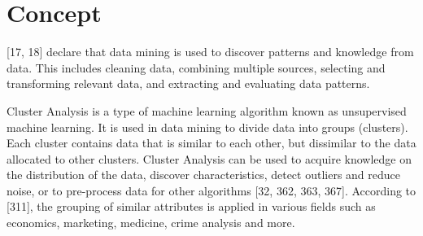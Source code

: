 \documentclass[12pt,a4paper]{article}
\title{\titlename}
\author{ \authorid\\ \scriptsize \address }
\date{\exposedate}
\begin{document}

\maketitle

\section*{Concept}

\textcite{han2011data}[17, 18] declare that data mining is used to discover patterns and knowledge from data. This includes cleaning data, combining multiple sources, selecting and transforming relevant data, and extracting and evaluating data patterns.

Cluster Analysis is a type of machine learning algorithm known as unsupervised machine learning. It is used in data mining to divide data into groups (clusters). Each cluster contains data that is similar to each other, but dissimilar to the data allocated to other clusters. Cluster Analysis can be used to acquire knowledge on the distribution of the data, discover characteristics, detect outliers and reduce noise, or to pre-process data for other algorithms \autocite{han2011data}[32, 362, 363, 367]. According to \textcite{bramer2007principles}[311], the grouping of similar attributes is applied in various fields such as economics, marketing, medicine, crime analysis and more.


\end{document}
